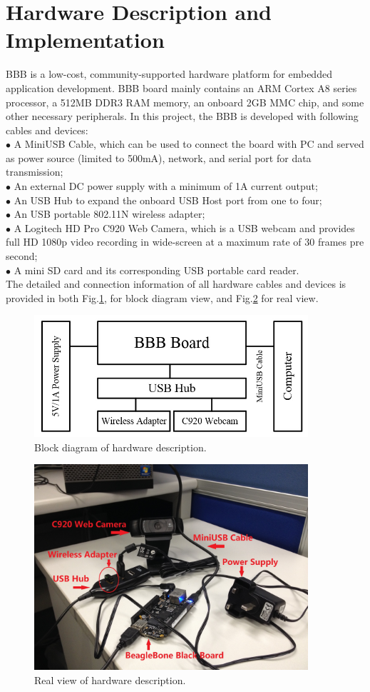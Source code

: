 \documentclass[12pt,journal,draftclsnofoot,onecolumn]{IEEEtran}
\begin{document}
\section{Hardware Description and Implementation}\label{HdDes}
BBB is a low-cost, community-supported hardware platform for embedded application development. BBB board mainly contains an ARM Cortex A8 series processor, a 512MB DDR3 RAM memory, an onboard 2GB MMC chip, and some other necessary peripherals. In this project, the BBB is developed with following cables and devices: \\
$\bullet$ A MiniUSB Cable, which can be used to connect the board with PC and served as power source (limited to 500mA), network, and serial port for data transmission;\\
$\bullet$ An external DC power supply with a minimum of 1A current output;\\
$\bullet$ An USB Hub to expand the onboard USB Host port from one to four;\\
$\bullet$ An USB portable 802.11N wireless adapter;\\
$\bullet$ A Logitech HD Pro C920 Web Camera, which is a USB webcam and provides full HD 1080p video recording in wide-screen at a maximum rate of 30 frames pre second;\\
$\bullet$ A mini SD card and its corresponding USB portable card reader.\\
The detailed and connection information of all hardware cables and devices is provided in both Fig.\ref{hw1}, for block diagram view, and Fig.\ref{hw2} for real view.
\begin{figure}[ht]
	\centering
	\includegraphics[width=4in]{./figs/hw1.jpg}
	\caption{Block diagram of hardware description.}
	\label{hw1}
\end{figure}
\begin{figure}[ht]
	\centering
	\includegraphics[width=4in]{./figs/hw2.jpg}
	\caption{Real view of hardware description.}
	\label{hw2}
\end{figure}
\end{document}
